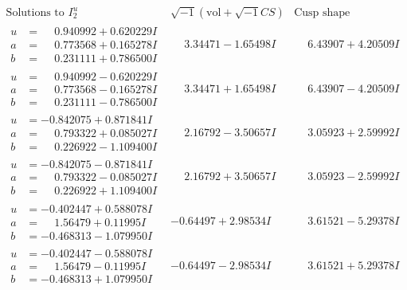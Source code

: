 \documentclass[1p]{elsarticle_modified}
\theoremstyle{definition}
\newcommand{\I}{\sqrt{-1}}
\begin{document}
$$\begin{array}{c|c|c}  
\text{Solutions to }I^u_{2}& \I (\text{vol} + \sqrt{-1}CS) & \text{Cusp shape}\\
 \hline 
\begin{aligned}
u &= \phantom{-}0.940992 + 0.620229 I \\
a &= \phantom{-}0.773568 + 0.165278 I \\
b &= \phantom{-}0.231111 + 0.786500 I\end{aligned}
 & \phantom{-}3.34471 - 1.65498 I & \phantom{-}6.43907 + 4.20509 I \\ \hline\begin{aligned}
u &= \phantom{-}0.940992 - 0.620229 I \\
a &= \phantom{-}0.773568 - 0.165278 I \\
b &= \phantom{-}0.231111 - 0.786500 I\end{aligned}
 & \phantom{-}3.34471 + 1.65498 I & \phantom{-}6.43907 - 4.20509 I \\ \hline\begin{aligned}
u &= -0.842075 + 0.871841 I \\
a &= \phantom{-}0.793322 + 0.085027 I \\
b &= \phantom{-}0.226922 - 1.109400 I\end{aligned}
 & \phantom{-}2.16792 - 3.50657 I & \phantom{-}3.05923 + 2.59992 I \\ \hline\begin{aligned}
u &= -0.842075 - 0.871841 I \\
a &= \phantom{-}0.793322 - 0.085027 I \\
b &= \phantom{-}0.226922 + 1.109400 I\end{aligned}
 & \phantom{-}2.16792 + 3.50657 I & \phantom{-}3.05923 - 2.59992 I \\ \hline\begin{aligned}
u &= -0.402447 + 0.588078 I \\
a &= \phantom{-}1.56479 + 0.11995 I \\
b &= -0.468313 - 1.079950 I\end{aligned}
 & -0.64497 + 2.98534 I & \phantom{-}3.61521 - 5.29378 I \\ \hline\begin{aligned}
u &= -0.402447 - 0.588078 I \\
a &= \phantom{-}1.56479 - 0.11995 I \\
b &= -0.468313 + 1.079950 I\end{aligned}
 & -0.64497 - 2.98534 I & \phantom{-}3.61521 + 5.29378 I \\ \hline\begin{aligned}

\end{aligned}
\end{array}$$
\end{document}
